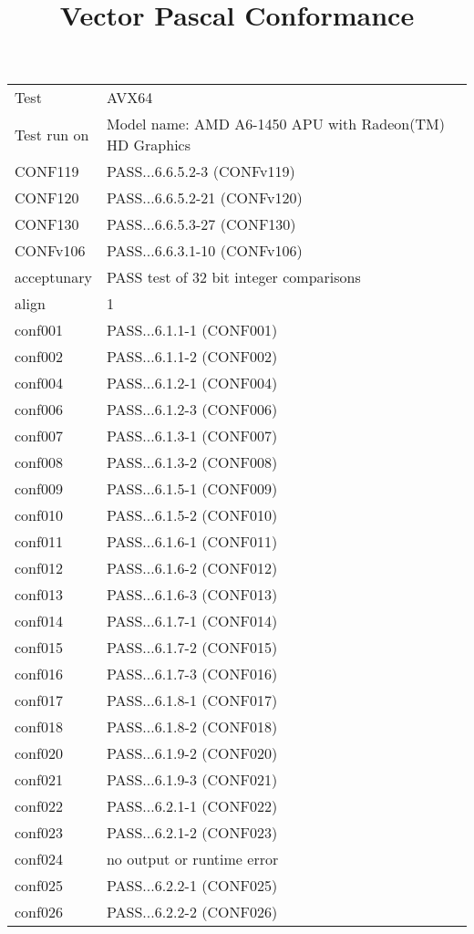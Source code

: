 \title{Vector Pascal Conformance}
\begin{tabular}{llc}Test&
AVX64&\\
Test run on&
Model name:          AMD A6-1450 APU with Radeon(TM) HD Graphics&\\
  CONF119& PASS...6.6.5.2-3 (CONFv119)&\\
  CONF120& PASS...6.6.5.2-21 (CONFv120)&\\
  CONF130& PASS...6.6.5.3-27 (CONF130)&\\
  CONFv106& PASS...6.6.3.1-10 (CONFv106)&\\
  acceptunary&PASS test of 32 bit integer comparisons &\\
  align&           1&\\
  conf001& PASS...6.1.1-1 (CONF001)&\\
  conf002& PASS...6.1.1-2 (CONF002)&\\
  conf004& PASS...6.1.2-1 (CONF004)&\\
  conf006& PASS...6.1.2-3 (CONF006)&\\
  conf007& PASS...6.1.3-1 (CONF007)&\\
  conf008& PASS...6.1.3-2 (CONF008)&\\
  conf009& PASS...6.1.5-1 (CONF009)&\\
  conf010& PASS...6.1.5-2 (CONF010)&\\
  conf011& PASS...6.1.6-1 (CONF011)&\\
  conf012& PASS...6.1.6-2 (CONF012)&\\
  conf013& PASS...6.1.6-3 (CONF013)&\\
  conf014& PASS...6.1.7-1 (CONF014)&\\
  conf015& PASS...6.1.7-2 (CONF015)&\\
  conf016& PASS...6.1.7-3 (CONF016)&\\
  conf017& PASS...6.1.8-1 (CONF017)&\\
  conf018& PASS...6.1.8-2 (CONF018)&\\
  conf020& PASS...6.1.9-2 (CONF020)&\\
  conf021& PASS...6.1.9-3 (CONF021)&\\
  conf022& PASS...6.2.1-1 (CONF022)&\\
  conf023& PASS...6.2.1-2 (CONF023)&\\
  conf024& no output or runtime error &\\
  conf025& PASS...6.2.2-1 (CONF025)&\\
  conf026& PASS...6.2.2-2 (CONF026)&\\

\end{tabular}
